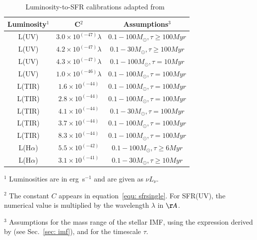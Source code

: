 \begin{table}
\centering
\caption{Luminosity-to-SFR calibrations adapted from~\cite{Calzetti13}}
\label{table1}
\begin{tabular}{ c c c }
\hline\hline
Luminosity$^1$ & C$^2$ & Assumptions$^3$\\
\hline
L(UV) & $3.0 \times 10^{(-47)} \lambda$ &$0.1 -100 M_{\odot}, \tau \ge 100 Myr $\\
L(UV) & $4.2 \times 10^{(-47)} \lambda$ &$0.1 -30 M_{\odot}, \tau \ge 100 Myr $\\
L(UV) & $4.3 \times 10^{(-47)}\lambda$ &$0.1 -100 M_{\odot}, \tau = 10 Myr $\\
L(UV) & $1.0 \times 10^{(-46)}\lambda$ &$0.1 -100 M_{\odot}, \tau = 100 Myr $\\
L(TIR) & $1.6 \times 10^{(-44)}$ &$0.1 -100 M_{\odot}, \tau = 100 Myr $\\
L(TIR) & $2.8 \times 10^{(-44)}$ &$0.1 -100 M_{\odot}, \tau = 100 Myr $\\
L(TIR) & $4.1 \times 10^{(-44)}$ &$0.1 -30 M_{\odot}, \tau = 100 Myr $\\
L(TIR) & $3.7 \times 10^{(-44)}$ &$0.1 -100 M_{\odot}, \tau = 100 Myr $\\
L(TIR) & $8.3 \times 10^{(-44)}$ &$0.1 -100 M_{\odot}, \tau = 100 Myr $\\
L(H${\alpha}$) & $5.5 \times 10^{(-42)}$&$0.1 -100 M_{\odot},  \tau \ge 6 Myr $\\
L(H${\alpha}$) & $3.1 \times 10^{(-41)}$&$0.1 -30 M_{\odot},  \tau \ge 10 Myr $\\
\hline
\end{tabular}
\begin{tablenotes}
\item $^1$ Luminosities are in erg~s$^{-1}$ and are given as $\nu L_{\nu}$.
\item $^2$ The constant $C$ appears in equation~\ref{equ: sfrsingle}. For SFR(UV), the numerical value is multiplied by the wavelength $\lambda$ in $\AA$. %
\item $^3$ Assumptions for the mass range of the stellar IMF, using the expression derived by \cite{Kroupa01} (see Sec.~\ref{sec: imf}), and for the timescale $\tau$.
\end{tablenotes}
\end{table}


